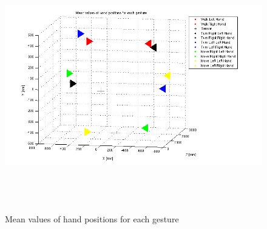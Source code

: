 \begin{figure}
	[h]
	\includegraphics[height=11cm]{figures/result/train-all-ges-mean.jpg} \caption{Mean values of hand positions for each gesture} \label{fg:ev:mean} 
\end{figure}
